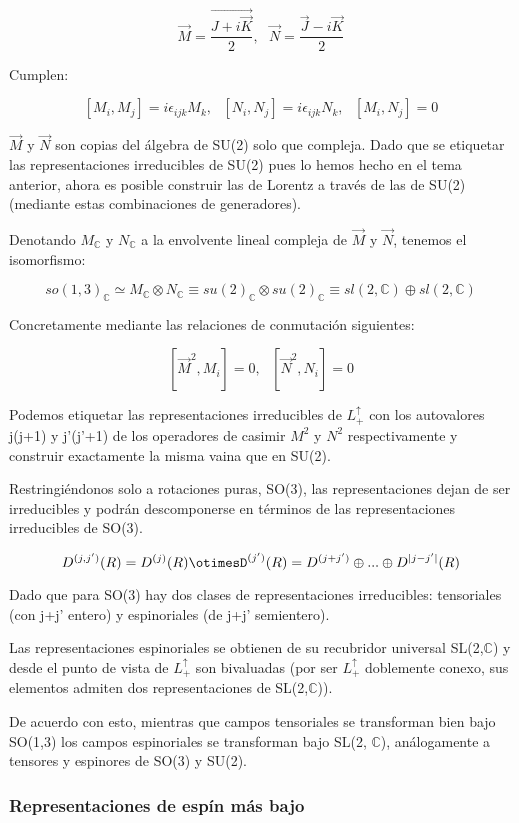 \documentclass{article}
\begin{document}
$$\Vec{M}=\frac{\Vec{J+i\Vec{K}}}{2}, \ \ \ \Vec{N}=\frac{\Vec{J}-i\Vec{K}}{2}$$

Cumplen:

$$[M_i,M_j]=i\epsilon _{ijk}M_k, \ \ \ [N_i,N_j]=i\epsilon _{ijk}N_k, \ \ \ [M_i,N_j]=0$$

$\Vec{M}$ y $\Vec{N}$ son copias del álgebra de SU(2) solo que compleja. Dado que se etiquetar las representaciones irreducibles de SU(2) pues lo hemos hecho en el tema anterior, ahora es posible construir las de Lorentz a través de las de SU(2) (mediante estas combinaciones de generadores).

\smallskip
Denotando $M_\mathds{C}$ y $N_\mathds{C}$ a la envolvente lineal compleja de $\Vec{M}$ y $\Vec{N}$, tenemos el isomorfismo:

$$so(1,3)_\mathds{C}\simeq M_\mathds{C}\otimes N_\mathds{C} \equiv su(2)_\mathds{C}\otimes su(2)_\mathds{C} \equiv sl(2,\mathds{C}) \oplus sl(2,\mathds{C})$$

Concretamente mediante las relaciones de conmutación siguientes:

$$[\Vec{M}^2,M_i]=0, \ \ \ [\Vec{N}^2,N_i]=0$$

Podemos etiquetar las representaciones irreducibles de $L^\uparrow _+$ con los autovalores j(j+1) y j'(j'+1) de los operadores de casimir $M^2$ y $N^2$ respectivamente y construir exactamente la misma vaina que en SU(2).

Restringiéndonos solo a rotaciones puras, SO(3), las representaciones dejan de ser irreducibles y podrán descomponerse en términos de las representaciones irreducibles de SO(3).

$$D^{(j,j')}(R)=D^{(j)}(R)\otimesD^{(j')}(R)=D^{(j+j')}\oplus ... \oplus D^{|j-j'|}(R)$$

Dado que para SO(3) hay dos clases de representaciones irreducibles: tensoriales (con j+j' entero) y espinoriales (de j+j' semientero).

Las representaciones espinoriales se obtienen de su recubridor universal SL(2,$\mathds{C}$) y desde el punto de vista de $L^\uparrow _+$ son bivaluadas (por ser $L^\uparrow _+$ doblemente conexo, sus elementos admiten dos representaciones de SL(2,$\mathds{C}$)).

\smallskip
De acuerdo con esto, mientras que campos tensoriales se transforman bien bajo SO(1,3) los campos espinoriales se transforman bajo SL(2, $\mathds{C}$), análogamente a tensores y espinores de SO(3) y SU(2).

\subsubsection{Representaciones de espín más bajo}
\end{document}
